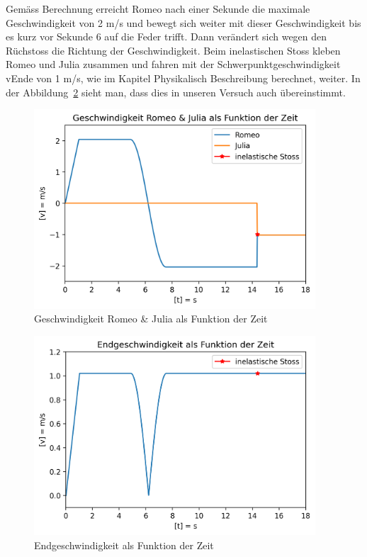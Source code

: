 \documentclass[../main.tex]{subfiles}
\begin{document}
    \noindent    Gemäss Berechnung erreicht Romeo nach einer Sekunde die maximale Geschwindigkeit von 2 m/s und bewegt sich weiter mit dieser Geschwindigkeit bis es kurz vor Sekunde 6 auf die Feder trifft. Dann verändert sich wegen den Rüchstoss die Richtung der Geschwindigkeit. Beim inelastischen Stoss kleben Romeo und Julia zusammen und fahren mit der Schwerpunktgeschwindigkeit vEnde von 1 m/s, wie im Kapitel Physikalisch Beschreibung berechnet, weiter. In der Abbildung~\ref{fig:Endgeschwindigkeit} sieht man, dass dies in unseren Versuch auch übereinstimmt.
    \begin{figure}[H]
        \begin{center}
            \centerline{\includegraphics[width=105mm]{./images/Inelastisch/GeschwindigkeitRomeoJulia}}
            \caption{Geschwindigkeit Romeo \& Julia als Funktion der Zeit}
            \label{fig:GeschwindigkeitRomeoJulia}
        \end{center}
    \end{figure}

    \begin{figure}[H]
        \begin{center}
            \centerline{\includegraphics[width=105mm]{./images/Inelastisch/Endgeschwindigkeit}}
            \caption{Endgeschwindigkeit als Funktion der Zeit}
            \label{fig:Endgeschwindigkeit}
        \end{center}
    \end{figure}
\end{document}
